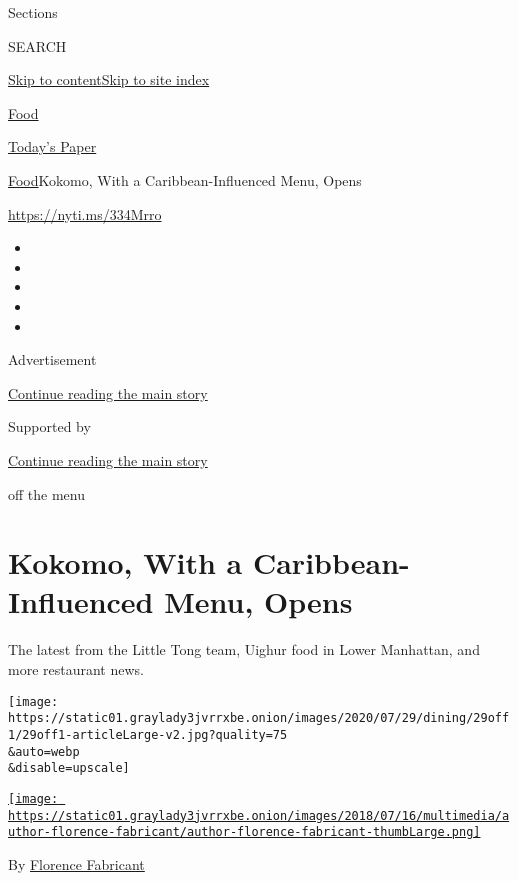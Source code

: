 Sections

SEARCH

\protect\hyperlink{site-content}{Skip to
content}\protect\hyperlink{site-index}{Skip to site index}

\href{https://www.nytimes3xbfgragh.onion/section/food}{Food}

\href{https://myaccount.nytimes3xbfgragh.onion/auth/login?response_type=cookie\&client_id=vi}{}

\href{https://www.nytimes3xbfgragh.onion/section/todayspaper}{Today's
Paper}

\href{/section/food}{Food}\textbar{}Kokomo, With a Caribbean-Influenced
Menu, Opens

\url{https://nyti.ms/334Mrro}

\begin{itemize}
\item
\item
\item
\item
\item
\end{itemize}

Advertisement

\protect\hyperlink{after-top}{Continue reading the main story}

Supported by

\protect\hyperlink{after-sponsor}{Continue reading the main story}

off the menu

\hypertarget{kokomo-with-a-caribbean-influenced-menu-opens}{%
\section{Kokomo, With a Caribbean-Influenced Menu,
Opens}\label{kokomo-with-a-caribbean-influenced-menu-opens}}

The latest from the Little Tong team, Uighur food in Lower Manhattan,
and more restaurant news.

\texttt{[image: https://static01.graylady3jvrrxbe.onion/images/2020/07/29/dining/29off1/29off1-articleLarge-v2.jpg?quality=75\\\&auto=webp\\\&disable=upscale]}

\href{https://www.nytimes3xbfgragh.onion/by/florence-fabricant}{\texttt{[image: https://static01.graylady3jvrrxbe.onion/images/2018/07/16/multimedia/author-florence-fabricant/author-florence-fabricant-thumbLarge.png]}}

By
\href{https://www.nytimes3xbfgragh.onion/by/florence-fabricant}{Florence
Fabricant}

